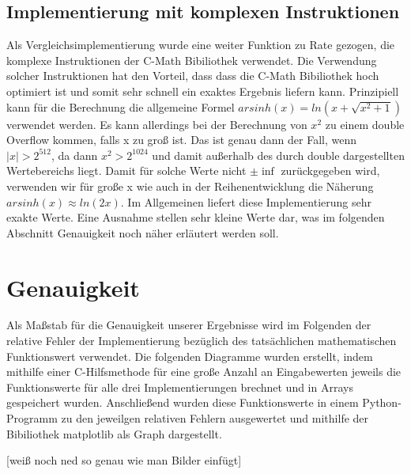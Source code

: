 \documentclass[course=erap] {aspdoc}
\begin{document}
    \subsection{Implementierung mit komplexen Instruktionen}
    
    Als Vergleichsimplementierung wurde eine weiter Funktion zu Rate gezogen, die komplexe Instruktionen der C-Math Bibiliothek verwendet. Die Verwendung solcher Instruktionen hat den Vorteil, dass dass die C-Math Bibiliothek hoch optimiert ist und somit sehr schnell ein exaktes Ergebnis liefern kann. Prinzipiell kann für die Berechnung die allgemeine Formel $ arsinh(x) = ln \left(x + \sqrt{x^2 + 1} \right)$ verwendet werden. Es kann allerdings bei der Berechnung von $x^2$ zu einem double Overflow kommen, falls x zu groß ist. Das ist genau dann der Fall, wenn $|x| > 2^{512}$, da dann $x^2 > 2^{1024}$ und damit außerhalb des durch double dargestellten Wertebereichs liegt. Damit für solche Werte nicht $\pm \inf$ zurückgegeben wird, verwenden wir für große x wie auch in der Reihenentwicklung die Näherung $arsinh(x)\approx ln(2x)$. Im Allgemeinen liefert diese Implementierung sehr exakte Werte. Eine Ausnahme stellen sehr kleine Werte dar, was im folgenden Abschnitt Genauigkeit noch näher erläutert werden soll.

    \section{Genauigkeit}
    Als Maßstab für die Genauigkeit unserer Ergebnisse wird im Folgenden der relative Fehler der Implementierung bezüglich des tatsächlichen mathematischen Funktionswert verwendet. Die folgenden Diagramme wurden erstellt, indem mithilfe einer C-Hilfsmethode für eine große Anzahl an Eingabewerten jeweils die Funktionswerte für alle drei Implementierungen brechnet und in Arrays gespeichert wurden. Anschließend wurden diese Funktionswerte in einem Python-Programm zu den jeweilgen relativen Fehlern ausgewertet und mithilfe der Bibiliothek matplotlib als Graph dargestellt.

    [weiß noch ned so genau wie man Bilder einfügt]
    
\end{document}
